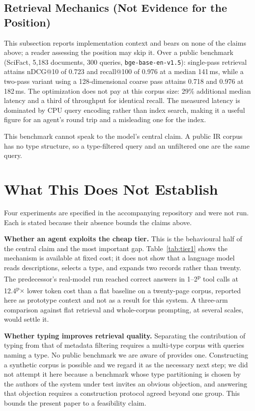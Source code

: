 \documentclass[journal,nofonttune]{IEEEtran}
\newcommand{\pn}[1]{#1\textsuperscript{\textsf{p}}}
\begin{document}
\subsection{Retrieval Mechanics (Not Evidence for the Position)}
This subsection reports implementation context and bears on none of the
claims above; a reader assessing the position may skip it. Over a public
benchmark
(SciFact, 5{,}183 documents, 300 queries,
\texttt{bge-base-en-v1.5}): single-pass retrieval attains nDCG@10 of 0.723
and recall@100 of 0.976 at a median 141\,ms, while a two-pass variant using a
128-dimensional coarse pass attains 0.718 and 0.976 at 182\,ms. The
optimization does not pay at this corpus size: 29\% additional median latency
and a third of throughput for identical recall. The measured latency is
dominated by CPU query encoding rather than index search, making it a useful
figure for an agent's round trip and a misleading one for the index.

This benchmark cannot speak to the model's central claim. A public IR corpus
has no type structure, so a type-filtered query and an unfiltered one are the
same query.

\section{What This Does Not Establish}
\label{sec:open}

Four experiments are specified in the accompanying repository and were not
run. Each is stated because their absence bounds the claims above.

\textbf{Whether an agent exploits the cheap tier.} This is the behavioural
half of the central claim and the most important gap. Table~\ref{tab:tier1}
shows the mechanism is available at fixed cost; it does not show that a
language model reads descriptions, selects a type, and expands two records
rather than twenty. The predecessor's real-model run reached correct answers
in \pn{1--2} tool calls at \pn{12.4}$\times$ lower token cost than a flat
baseline on a twenty-page corpus, reported here as prototype context and not
as a result for this system. A three-arm comparison against flat retrieval
and whole-corpus prompting, at several scales, would settle it.

\textbf{Whether typing improves retrieval quality.} Separating the
contribution of typing from that of metadata filtering requires a multi-type
corpus with queries naming a type. No public benchmark we are aware of
provides one. Constructing a synthetic corpus is possible and we regard it as
the necessary next step; we did not attempt it here because a benchmark whose
type partitioning is chosen by the authors of the system under test invites
an obvious objection, and answering that objection requires a construction
protocol agreed beyond one group. This bounds the present paper to a
feasibility claim.
\end{document}

